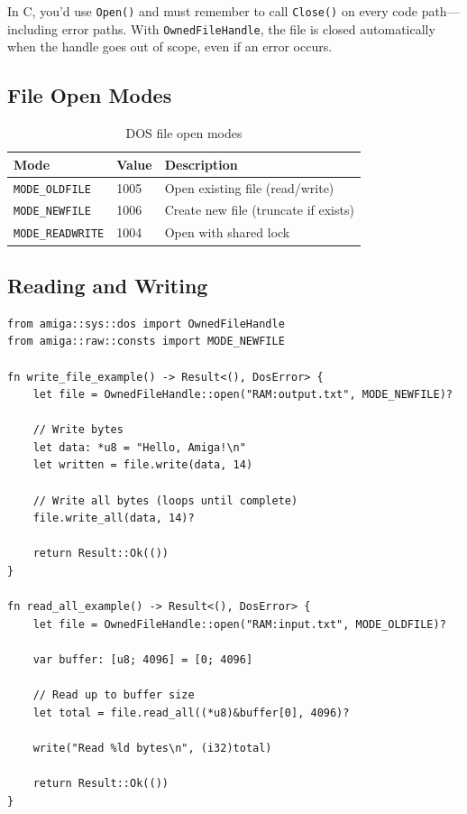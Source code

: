 \begin{comingfromc}
In C, you'd use \texttt{Open()} and must remember to call \texttt{Close()} on every code path---including error paths. With \texttt{OwnedFileHandle}, the file is closed automatically when the handle goes out of scope, even if an error occurs.
\end{comingfromc}

\subsection{File Open Modes}

\begin{table}[h]
\centering
\begin{tabular}{lll}
\textbf{Mode} & \textbf{Value} & \textbf{Description} \\
\hline
\texttt{MODE\_OLDFILE} & 1005 & Open existing file (read/write) \\
\texttt{MODE\_NEWFILE} & 1006 & Create new file (truncate if exists) \\
\texttt{MODE\_READWRITE} & 1004 & Open with shared lock \\
\end{tabular}
\caption{DOS file open modes}
\end{table}

\subsection{Reading and Writing}

\begin{lstlisting}
from amiga::sys::dos import OwnedFileHandle
from amiga::raw::consts import MODE_NEWFILE

fn write_file_example() -> Result<(), DosError> {
    let file = OwnedFileHandle::open("RAM:output.txt", MODE_NEWFILE)?

    // Write bytes
    let data: *u8 = "Hello, Amiga!\n"
    let written = file.write(data, 14)

    // Write all bytes (loops until complete)
    file.write_all(data, 14)?

    return Result::Ok(())
}

fn read_all_example() -> Result<(), DosError> {
    let file = OwnedFileHandle::open("RAM:input.txt", MODE_OLDFILE)?

    var buffer: [u8; 4096] = [0; 4096]

    // Read up to buffer size
    let total = file.read_all((*u8)&buffer[0], 4096)?

    write("Read %ld bytes\n", (i32)total)

    return Result::Ok(())
}
\end{lstlisting}

